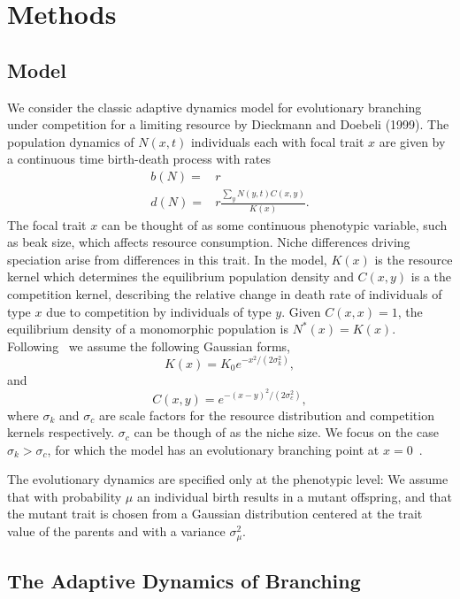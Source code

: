 \documentclass{article}
\begin{document}
\section{Methods}
\subsection{Model}
We consider the classic adaptive dynamics model for evolutionary branching under competition for a limiting resource by Dieckmann and Doebeli (1999).  The population dynamics of $N(x,t)$ individuals each with focal trait $x$ are given by a continuous time birth-death process with rates 
\begin{align}
b(N) = & r \nonumber \\
d(N) = & r \frac{\sum_yN(y,t)C(x,y)}{K(x)} .\label{general_logistic}
\end{align}
The focal trait $x$ can be thought of as some continuous phenotypic variable, such as beak size, which affects resource consumption.  Niche differences driving speciation arise from differences in this trait.  In the model, $K(x)$ is the resource kernel which determines the equilibrium population density and $C(x,y)$ is a the competition kernel, describing the relative change in death rate of individuals of type $x$ due to competition by individuals of type $y$.  Given $C(x,x)=1$, the equilibrium density of a monomorphic population is $N^{\ast}(x)=K(x)$.  Following~\citet{dieckmann_nat1999} we assume the following Gaussian forms,
\begin{equation}
K(x)=K_0e^{-x^2/(2\sigma_k^2)}, \label{K}
\end{equation}
and
\begin{equation}
C(x,y)=e^{-(x-y)^2/(2\sigma_c^2)}, \label{C}
\end{equation}
where $\sigma_k$ and $\sigma_c$ are scale factors for the resource distribution and competition kernels respectively.  $\sigma_c$ can be though of as the niche size.  We focus on the case $\sigma_k>\sigma_c$, for which the model has an evolutionary branching point at $x=0$~\citep{geritz_evoeco1998}.  

The evolutionary dynamics are specified only at the phenotypic level: We assume that with probability $\mu$ an individual birth results in a mutant offspring, and that the mutant trait is chosen from a Gaussian distribution centered at the trait value of the parents and with a variance $\sigma_{\mu}^2$. 


\subsection{The Adaptive Dynamics of Branching}
\end{document}
